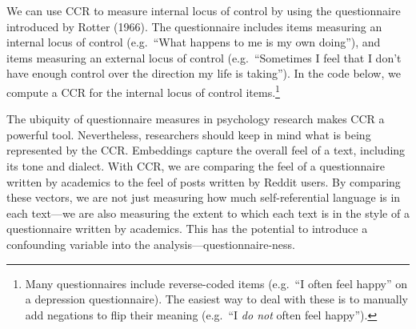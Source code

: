 \documentclass[
  man,
  floatsintext,
  longtable,
  nolmodern,
  notxfonts,
  notimes,
  colorlinks=true,linkcolor=blue,citecolor=blue,urlcolor=blue]{apa7}
\newenvironment{Shaded}{\begin{snugshade}}{\end{snugshade}}
\newcommand{\AttributeTok}[1]{\textcolor[rgb]{0.40,0.45,0.13}{#1}}
\newcommand{\CommentTok}[1]{\textcolor[rgb]{0.37,0.37,0.37}{#1}}
\newcommand{\ConstantTok}[1]{\textcolor[rgb]{0.56,0.35,0.01}{#1}}
\newcommand{\DecValTok}[1]{\textcolor[rgb]{0.68,0.00,0.00}{#1}}
\newcommand{\FunctionTok}[1]{\textcolor[rgb]{0.28,0.35,0.67}{#1}}
\newcommand{\NormalTok}[1]{\textcolor[rgb]{0.00,0.23,0.31}{#1}}
\newcommand{\OtherTok}[1]{\textcolor[rgb]{0.00,0.23,0.31}{#1}}
\newcommand{\SpecialCharTok}[1]{\textcolor[rgb]{0.37,0.37,0.37}{#1}}
\newcommand{\StringTok}[1]{\textcolor[rgb]{0.13,0.47,0.30}{#1}}
\begin{document}
We can use CCR to measure internal locus of control by using the
questionnaire introduced by Rotter (1966). The questionnaire includes
items measuring an internal locus of control (e.g.~``What happens to me
is my own doing''), and items measuring an external locus of control
(e.g.~``Sometimes I feel that I don't have enough control over the
direction my life is taking''). In the code below, we compute a CCR for
the internal locus of control items.\footnote{Many questionnaires
  include reverse-coded items (e.g.~``I often feel happy'' on a
  depression questionnaire). The easiest way to deal with these is to
  manually add negations to flip their meaning (e.g.~``I \emph{do not}
  often feel happy'').}

\begin{Shaded}
\end{Shaded}

The ubiquity of questionnaire measures in psychology research makes CCR
a powerful tool. Nevertheless, researchers should keep in mind what is
being represented by the CCR. Embeddings capture the overall feel of a
text, including its tone and dialect. With CCR, we are comparing the
feel of a questionnaire written by academics to the feel of posts
written by Reddit users. By comparing these vectors, we are not just
measuring how much self-referential language is in each text---we are
also measuring the extent to which each text is in the style of a
questionnaire written by academics. This has the potential to introduce
a confounding variable into the analysis---questionnaire-ness.
\end{document}
